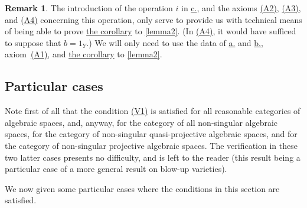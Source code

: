 \documentclass{article}
\theoremstyle{plain}
\theoremstyle{definition}
\newtheorem*{remark}{Remark}
\begin{document}
\begin{remark}
  The introduction of the operation $i$ in \hyperref[datac]{c.}, and the axioms \hyperref[axiomA2]{(A2)}, \hyperref[axiomA3]{(A3)}, and \hyperref[axiomA4]{(A4)} concerning this operation, only serve to provide us with technical means of being able to prove \hyperref[lemma2corollary]{the corollary} to \cref{lemma2}.
  (In \hyperref[axiomA4]{(A4)}, it would have sufficed to suppose that $b=1_Y$.)
  We will only need to use the data of \hyperref[dataa]{a.} and \hyperref[datab]{b.}, axiom~\hyperref[axiomA2]{(A1)}, and \hyperref[lemma2corollary]{the corollary} to \cref{lemma2}.
\end{remark}


\subsection*{Particular cases}

Note first of all that the condition \hyperref[axiomV1]{(V1)} is satisfied for all reasonable categories of algebraic spaces, and, anyway, for the category of all non-singular algebraic spaces, for the category of non-singular quasi-projective algebraic spaces, and for the category of non-singular projective algebraic spaces.
The verification in these two latter cases presents no difficulty, and is left to the reader (this result being a particular case of a more general result on blow-up varieties).

We now given some particular cases where the conditions in this section are satisfied.
\end{document}
